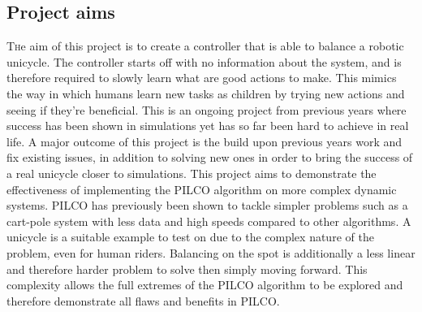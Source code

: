 \documentclass[twoside,twocolumn,12pt]{article}
\begin{document}
\subsection{Project aims}
\lettrine[nindent=0em,lines=3]{T}he aim of this project is to create a controller that is able to balance a robotic unicycle. The controller starts off with no information about the system, and is therefore required to slowly learn what are good actions to make. This mimics the way in which humans learn new tasks as children by trying new actions and seeing if they're beneficial.
\newline
This is an ongoing project from previous years where success has been shown in simulations yet has so far been hard to achieve in real life. A major outcome of this project is the build upon previous years work and fix existing issues, in addition to solving new ones in order to bring the success of a real unicycle closer to simulations. 
\newline
This project aims to demonstrate the effectiveness of implementing the PILCO algorithm \cite{pilco} on more complex dynamic systems. PILCO has previously been shown to tackle simpler problems such as a cart-pole system with less data and high speeds compared to other algorithms. 
\newline 
A unicycle is a suitable example to test on due to the complex nature of the problem, even for human riders. Balancing on the spot is additionally a less linear and therefore harder problem to solve then simply moving forward. This complexity allows the full extremes of the PILCO algorithm to be explored and therefore demonstrate all flaws and benefits in PILCO.
\end{document}
